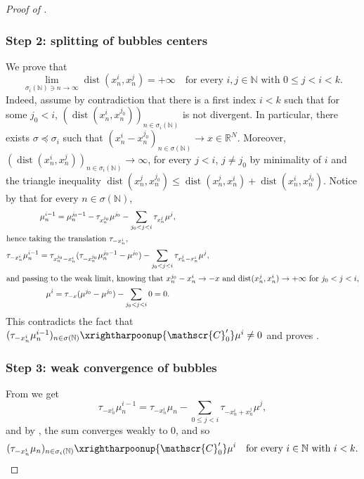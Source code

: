 \documentclass[10pt]{amsart}
\theoremstyle{plain}
\theoremstyle{definition}
\newcommand{\N}{\mathbb{N}}
\newcommand{\R}{\mathbb{R}}
\newcommand{\Cspace}{\mathscr{C}}
\DeclareMathOperator{\dist}{dist}
\newcommand{\mweakto}{\xrightharpoonup{\Cspace_0'}}
\begin{document}
\begin{proof}[Proof of ]
\subsubsection*{Step 2: splitting of bubbles centers} We prove that
\begin{equation}\label{splittingWeak}
\lim_{\sigma_i(\N) \ni n\to\infty} \dist(x^i_{n},x^j_{n}) =+\infty \quad\text{for every \(i,j\in\N\) with \(0\le j<i<k\)}.
\end{equation}
Indeed, assume by contradiction that there is a first index \(i<k\) such that for some \(j_0<i\), \((\dist(x^i_{n},x^{j_0}_{n}))_{n\in\sigma_i(\N)}\) is not divergent. In particular, there exists \(\sigma\preceq\sigma_i\) such that \((x^i_{n}-x^{j_0}_{n})_{n\in\sigma(\N)}\to x\in\R^N\). Moreover, \((\dist(x^i_n,x^j_n))_{n\in\sigma_i(\N)}\to\infty\), for every \(j<i\), \(j\neq j_0\) by minimality of $i$ and the triangle inequality $\dist(x_n^j,x_n^{j_0}) \leq \dist(x_n^j,x_n^i) + \dist(x_n^i,x_n^{j_0})$. Notice by  that for every $n\in \sigma(\N)$,
\begin{gather*}
\mu_n^{i-1} = \mu_n^{j_0-1} - \tau_{x_n^{j_0}} \mu^{j_0} - \sum_{j_0 < j < i} \tau_{x_n^j} \mu^j,\\
\shortintertext{hence taking the translation $\tau_{-x_n^i}$,}
\tau_{-x_n^i} \mu_n^{i-1} = \tau_{x_n^{j_0}-x_n^i} (\tau_{-x_n^{j_0}} \mu_n^{j_0-1}-\mu^{j_0}) - \sum_{j_0 < j < i} \tau_{x_n^j-x_n^i} \mu^j,\\
\shortintertext{and passing to the weak limit, knowing that $x_n^{j_0}-x_n^i \to -x$ and $\dist(x_n^j,x_n^i) \to +\infty$ for $j_0 < j <i$,}
\mu^i = \tau_{-x}(\mu^{j_0}-\mu^{j_0}) - \sum_{j_0 < j < i} 0 = 0.
\end{gather*}
This contradicts the fact that \((\tau_{-x^i_n}\mu^{i-1}_n)_{n\in\sigma(\N)}\mweakto\mu^i\neq 0\) and proves .

\subsubsection*{Step 3: weak convergence of bubbles}
From  we get\vspace*{-3pt}
\begin{equation}\label{bubbleWeak}
\tau_{-x^i_n}\mu^{i-1}_n =\tau_{-x^i_n}\mu_n-\sum_{0\le j<i}\tau_{-x^i_n+x^j_n}\mu^j,
\end{equation}
and by , the sum converges weakly to $0$, and so\vspace*{-3pt}\enlargethispage{\baselineskip}
\begin{equation}\label{bubbleWeakConvergence}
(\tau_{-x^i_n}\mu_n)_{n\in\sigma_i(\N)}\mweakto \mu^i\quad\text{for every \(i\in\N\) with \(i<k\)}.
\end{equation}


\end{proof}
\end{document}
